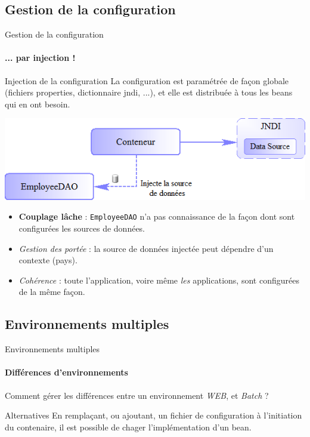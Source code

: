 \documentclass[compress]{beamer}%
\begin{document}
\subsection{Gestion de la configuration}

\begin{frame}{Gestion de la configuration}
	\framesubtitle{... par injection !}

	\begin{block}{Injection de la configuration}
	La configuration est paramétrée de façon globale (fichiers properties, dictionnaire jndi, ...), et elle est distribuée à tous les beans qui en ont besoin.
	\end{block}
\end{frame}

\begin{frame}

	\includegraphics[width=\textwidth]{images/spring_datasource_with.png}

	\pause
	\begin{itemize}[<+->]
		\item \textbf{Couplage lâche} : \texttt{EmployeeDAO} n'a pas connaissance de la façon dont sont configurées les sources de données.
		\item \emph{Gestion des portée} : la source de données injectée peut dépendre d'un contexte (pays).
		\item \emph{Cohérence} : toute l'application, voire même \emph{les} applications, sont configurées de la même façon.
	\end{itemize}
\end{frame}

\subsection{Environnements multiples}

\begin{frame}{Environnements multiples}
	\framesubtitle{Différences d'environnements}

	\begin{center}
		Comment gérer les différences entre un environnement \emph{WEB}, et \emph{Batch} ?
	\end{center}

	\pause
	\begin{block}{Alternatives}
		En remplaçant, ou ajoutant, un fichier de configuration à l'initiation du contenaire, il est possible de chager l'implémentation d'un bean.
	\end{block}

\end{frame}
\end{document}
